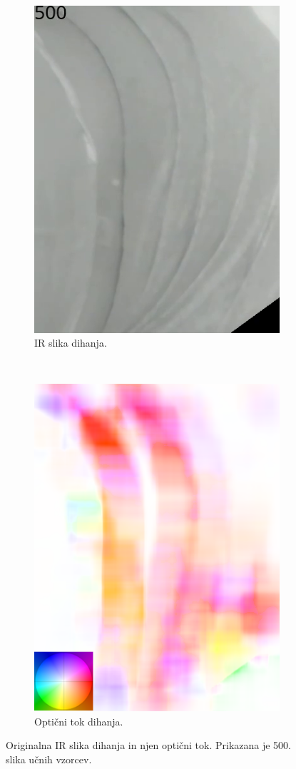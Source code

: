 \begin{figure}[htb]
	\centering
	\begin{subfigure}{0.45\columnwidth}
		\centering
		\includegraphics[width=0.75\columnwidth]{./Slike/breathtest-500.png}
		\caption{IR slika dihanja.}
		\label{fig:dihanje-orig}
	\end{subfigure}
	~
	\begin{subfigure}{0.45\columnwidth}
		\centering
		\includegraphics[width=0.75\columnwidth, frame]{./Slike/breathtest-flow-coding.png}
		\caption{Optični tok dihanja.}
		\label{fig:dihanje-of}
	\end{subfigure}
	\caption[Originalna IR slika dihanja in njen optični tok.]{Originalna IR slika dihanja in njen optični tok. Prikazana je 500. slika učnih vzorcev.}
	\label{fig:dihanje}
\end{figure} 

